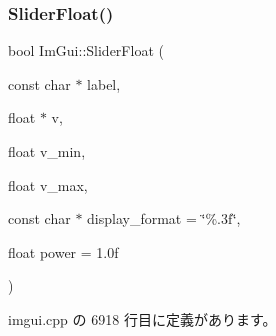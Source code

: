 \subsubsection{\texorpdfstring{Slider\+Float()}{SliderFloat()}}
{\footnotesize\ttfamily bool Im\+Gui\+::\+Slider\+Float (\begin{DoxyParamCaption}\item[{const char $\ast$}]{label,  }\item[{float $\ast$}]{v,  }\item[{float}]{v\+\_\+min,  }\item[{float}]{v\+\_\+max,  }\item[{const char $\ast$}]{display\+\_\+format = {\ttfamily \char`\"{}\%.3f\char`\"{}},  }\item[{float}]{power = {\ttfamily 1.0f} }\end{DoxyParamCaption})}



 imgui.\+cpp の 6918 行目に定義があります。

